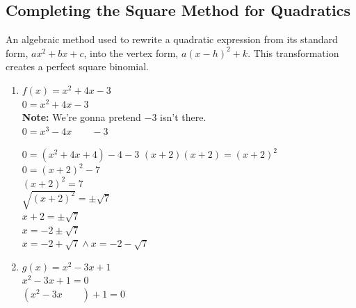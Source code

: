\subsection{Completing the Square Method for Quadratics}
\begin{definition}
  An algebraic method used to rewrite a quadratic expression from its standard form, $ax^2 + bx + c$, into the vertex form, $a(x - h)^2 + k$. This transformation creates a perfect square binomial.
\end{definition}
\begin{example}
  \hfill
  \begin{enumerate}
  \item $f(x) = x^2 + 4x - 3$ \\
    $0 = x^2 + 4x - 3$ \\
    \textbf{Note: }We're gonna pretend $-3$ isn't there. \\
    $0 = x^3 - 4x \qquad - 3$ \\
    \begin{center}
    \end{center}
    $0 = (x^2 + 4x + 4) -4 -3$ \qquad $(x + 2) (x + 2) = (x + 2)^2$ \\
    $0 = (x + 2)^2 - 7$ \\
    $(x + 2)^2 = 7$ \\
    $\sqrt{(x + 2)^2} = \pm \sqrt{7}$ \\
    $x + 2 = \pm \sqrt{7}$ \\
    $x = -2 \pm \sqrt{7}$ \\
    $x = -2 + \sqrt{7} \land x = -2 -\sqrt{7}$
  \item $g(x) = x^2 - 3x + 1$ \\
    $x^2 - 3x + 1 = 0$ \\
    $(x^2 - 3x \qquad) + 1 = 0$ \\
    \begin{center}
\end{center}
\end{enumerate}
\end{example}
